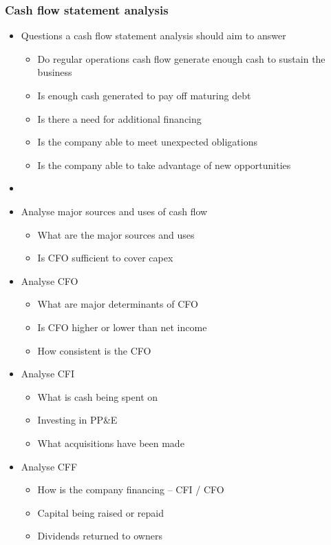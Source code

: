 \documentclass[../notes_compiled.tex]{subfiles}
\begin{document}
\subsubsection{Cash flow statement analysis}
\begin{itemize}
\item Questions a cash flow statement analysis should aim to answer
\begin{itemize}
\item Do regular operations cash flow generate enough cash to sustain the business
\item Is enough cash generated to pay off maturing debt
\item Is there a need for additional financing
\item Is the company able to meet unexpected obligations
\item Is the company able to take advantage of new opportunities
\end{itemize}

\item[]
\item Analyse major sources and uses of cash flow
\begin{itemize}
\item What are the major sources and uses
\item Is CFO sufficient to cover capex
\end{itemize}

\item Analyse CFO
\begin{itemize}
\item What are major determinants of CFO
\item Is CFO higher or lower than net income
\item How consistent is the CFO
\end{itemize}

\item Analyse CFI
\begin{itemize}
\item What is cash being spent on
\item Investing in PP\&E
\item What acquisitions have been made
\end{itemize}

\item Analyse CFF
\begin{itemize}
\item How is the company financing -- CFI / CFO
\item Capital being raised or repaid
\item Dividends returned to owners
\end{itemize}


\end{itemize}
\end{document}
